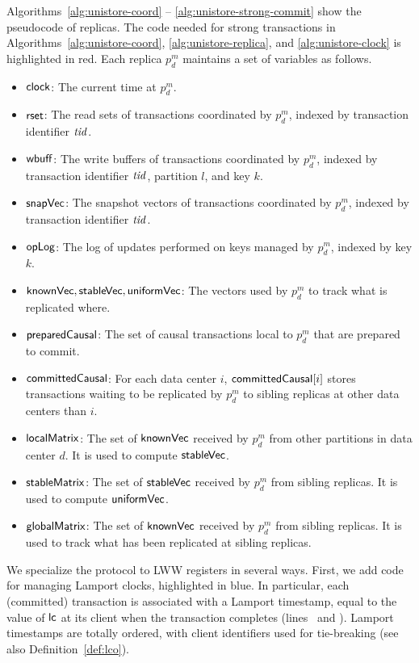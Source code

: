 Algorithms~\ref{alg:unistore-coord} -- \ref{alg:unistore-strong-commit} show the
pseudocode of replicas. The code needed for strong transactions in
Algorithms~\ref{alg:unistore-coord}, \ref{alg:unistore-replica}, and
\ref{alg:unistore-clock} is highlighted in red.  Each replica $p^{m}_{d}$
maintains a set of variables as follows.
\begin{itemize}
  \item{${\sf clock}$:} The current time at $p^{m}_{d}$.
  \item{${\sf rset}$:} The read sets of transactions coordinated by $p^{m}_{d}$,
    indexed by transaction identifier $\mathit{tid}$.
  \item{${\sf wbuff}$:} The write buffers of transactions coordinated by $p^{m}_{d}$,
    indexed by transaction identifier $\mathit{tid}$, partition $l$, and key $k$.
  \item{${\sf snapVec}$:} The snapshot vectors of transactions coordinated by $p^{m}_{d}$,
    indexed by transaction identifier $\mathit{tid}$.
  \item{${\sf opLog}$:} The log of updates performed on keys managed by $p^{m}_{d}$,
    indexed by key $k$.
  \item{${\sf knownVec}, {\sf stableVec}, {\sf uniformVec}$:}
    The vectors used by $p^{m}_{d}$ to track what is replicated where.
  \item{${\sf preparedCausal}$:} The set of causal transactions
    local to $p^{m}_{d}$ that are prepared to commit.
  \item{${\sf committedCausal}$:} For each data center $i$,
    ${\sf committedCausal}[i]$ stores transactions waiting to be
    replicated by $p^{m}_{d}$ to sibling replicas at other data centers than $i$.
  \item{${\sf localMatrix}$:} The set of ${\sf knownVec}$ received by $p^{m}_{d}$
    from other partitions in data center $d$.
    It is used to compute ${\sf stableVec}$.
  \item{${\sf stableMatrix}$:} The set of ${\sf stableVec}$ received by $p^{m}_{d}$
    from sibling replicas.
    It is used to compute ${\sf uniformVec}$.
  \item{${\sf globalMatrix}$:} The set of ${\sf knownVec}$ received by $p^{m}_{d}$
    from sibling replicas.
    It is used to track what has been replicated at sibling replicas.
\end{itemize}

We specialize the \unistore{} protocol to LWW registers in several ways.
First, we add code for managing Lamport clocks, highlighted in blue.
In particular, each (committed) transaction is associated with a Lamport
timestamp, equal to the value of ${\sf lc}$ at its client when the transaction completes
(lines~\code{\ref{alg:unistore-client}}{\ref{line:commitcausaltx-lc}}
and \code{\ref{alg:unistore-client}}{\ref{line:commitstrongtx-lc}}).
Lamport timestamps are totally ordered, with client identifiers used for tie-breaking
(see also Definition~\ref{def:lco}).

